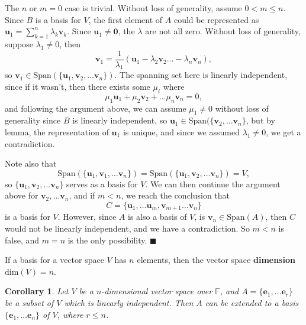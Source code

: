 \documentclass[letter-paper]{tufte-book}
\newtheorem{corollary}[theorem]{\color{pastel-blue}Corollary}
\newenvironment{proof}[1][Proof]{\begin{trivlist}
\item[\hskip \labelsep {\bfseries #1}]}{\end{trivlist}}
\newcommand{\eb}{{\boldsymbol{e}}}
\newcommand{\ub}{{\boldsymbol{u}}}
\newcommand{\vb}{{\boldsymbol{v}}}
\newcommand{\qed}{\hfill$\blacksquare$}
\begin{document}
\begin{proof}
  The $n$ or $m=0$ case is trivial. Without loss of generality, assume $0 < m
  \leq n$. Since $B$ is a basis for $V$, the first element of $A$ could be
  represented as $\ub_1 = \sum_{k=1}^n \lambda_k \vb_k$. Since $\ub_1 \neq
  \boldsymbol{0}$, the $\lambda$ are not all zero. Without loss of generality,
  suppose $\lambda_1 \neq 0$, then
  \begin{equation*}
    \vb_1 = \frac{1}{\lambda_1}(\ub_1 - \lambda_2\vb_2 \ldots - \lambda_n \vb_n),
  \end{equation*}
  so $\vb_1 \in \mbox{Span}(\{\ub_1, \vb_2, \ldots \vb_n\})$. The spanning set
  here is linearly independent, since if it wasn't, then there exists some
  $\mu_i$ where
  \begin{equation*}
    \mu_1 \ub_1 + \mu_2 \vb_2 + \ldots \mu_n \vb_n = 0,
  \end{equation*}
  and following the argument above, we can assume $\mu_1 \neq 0$ without loss of
  generality since $B$ is linearly independent, so $\ub_1 \in
  \mbox{Span}(\{\vb_2, \ldots \vb_n \}$, but by lemma, the representation of
  $\ub_1$ is unique, and since we assumed $\lambda_1 \neq 0$, we get a
  contradiction. 
  
  Note also that
  \begin{equation*}
    \mbox{Span}(\{\ub_1, \vb_1, \ldots \vb_n\}) = \mbox{Span}(\{\ub_1, \vb_2, \ldots \vb_n\}) = V,
  \end{equation*}
  so $\{\ub_1, \vb_2, \ldots \vb_n\}$ serves as a basis for $V$. We can then
  continue the argument above for $\vb_2, \ldots \vb_n$, and if $m<n$, we reach
  the conclusion that
  \begin{equation*}
    C = \{\ub_1, \ldots \ub_m, \vb_{m+1} \ldots \vb_n\}
  \end{equation*}
  is a basis for $V$. However, since $A$ is also a basis of $V$, is $\vb_n \in
  \mbox{Span}(A)$, then $C$ would not be linearly independent, and we have a
  contradiction. So $m<n$ is false, and $m=n$ is the only possibility. \qed
\end{proof}

If a basis for a vector space $V$ has $n$ elements, then the vector space
\textbf{dimension} $\mbox{dim}(V) = n$.

\begin{corollary}
  Let $V$ be a $n$-dimensional vector space over $\mathbb{F}$, and $A = \{\eb_1,
  \ldots \eb_r\}$ be a subset of $V$ which is linearly independent. Then $A$ can
  be extended to a basis $\{\eb_1, \ldots \eb_n\}$ of $V$, where $r \leq n$.
\end{corollary}
\end{document}
